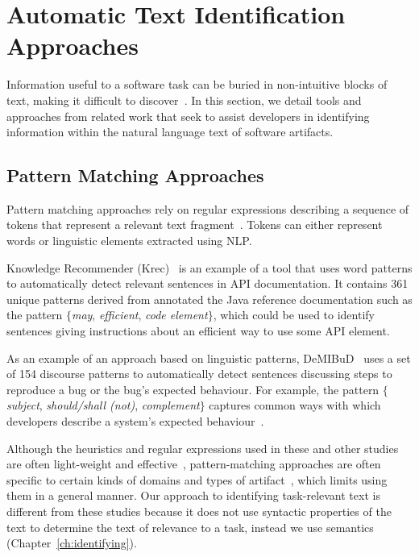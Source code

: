 \section{Automatic Text Identification Approaches}
\label{cp2:automatic-approaches}



Information useful to a software task can be buried in  
non-intuitive blocks of text, making it difficult to discover~\cite{Robillard2015}.
In this section, we detail tools and approaches from related work
that seek to assist developers in 
identifying information within the natural language
text of software artifacts.





\subsection{Pattern Matching Approaches}
\label{cp2:pattern-matching}


Pattern matching approaches rely on regular expressions describing a sequence of tokens that represent
 a relevant text fragment~\cite{Bavota2016}. Tokens can either represent words or linguistic elements 
extracted using \acf{NLP}.
    

Knowledge Recommender (Krec)~\cite{Robillard2015} 
is an example of a
 tool that uses word patterns to 
 automatically detect relevant sentences in  API documentation. 
It contains 361 unique patterns derived from annotated the Java reference documentation
such as the pattern {\small \textit{$\{$may}, \textit{efficient}, \textit{code element$\}$}}, 
which could be used to identify sentences giving instructions about an efficient way to 
use some API element. 

As an example of an approach based on linguistic patterns,
{\small DeMIBuD}~\cite{Chaparro2017} uses a set of 154 discourse patterns
to
automatically detect sentences discussing steps to reproduce 
a bug or the bug's expected behaviour.
For example, the pattern 
{\small \textit{$\{$subject}, \textit{should/shall (not)}, \textit{complement$\}$}}
captures common ways with which developers describe a system's expected behaviour~\cite{Chaparro2017}.





Although the heuristics and regular expressions used in these and other studies~\cite{nadi2020, Maalej2013}
are often light-weight and effective~\cite{Bavota2016}, 
pattern-matching approaches are often specific to certain kinds of domains and types of artifact~\cite{fucci2019}, which limits
using them in a general manner. 
Our approach to identifying task-relevant text 
is different from these studies because it does not use syntactic properties of the text
to determine the text of relevance to a task, 
instead we use semantics (Chapter~\ref{ch:identifying}).





